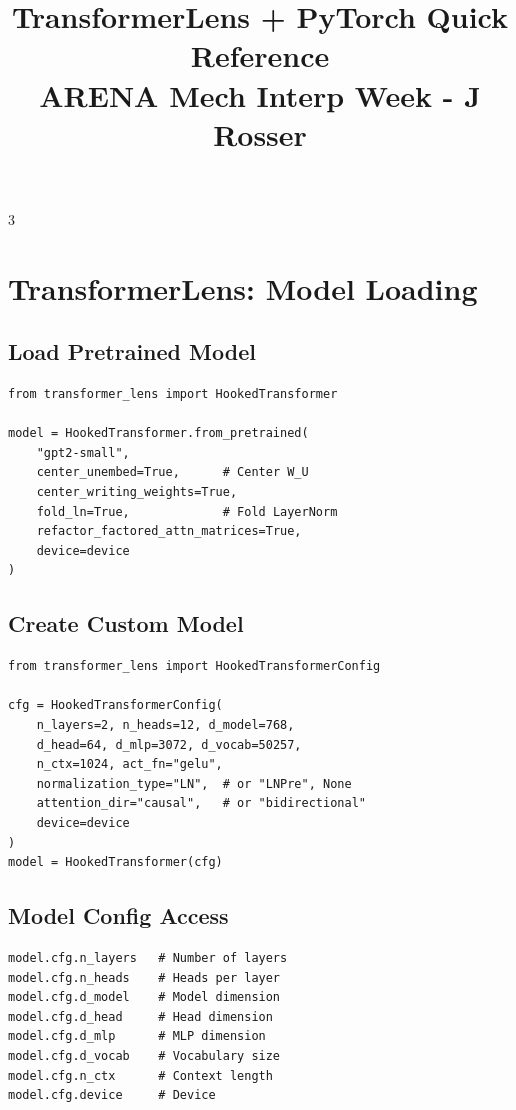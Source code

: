 \documentclass[10pt,a4paper,landscape]{article}
\title{\vspace{-2em}\textbf{TransformerLens + PyTorch Quick Reference}\\\large ARENA Mech Interp Week - J Rosser}
\author{}
\date{}
\begin{document}
\maketitle
\vspace{-3em}

\begin{multicols}{3}

\section{TransformerLens: Model Loading}

\subsection{Load Pretrained Model}
\begin{lstlisting}
from transformer_lens import HookedTransformer

model = HookedTransformer.from_pretrained(
    "gpt2-small",
    center_unembed=True,      # Center W_U
    center_writing_weights=True,
    fold_ln=True,             # Fold LayerNorm
    refactor_factored_attn_matrices=True,
    device=device
)
\end{lstlisting}

\subsection{Create Custom Model}
\begin{lstlisting}
from transformer_lens import HookedTransformerConfig

cfg = HookedTransformerConfig(
    n_layers=2, n_heads=12, d_model=768,
    d_head=64, d_mlp=3072, d_vocab=50257,
    n_ctx=1024, act_fn="gelu",
    normalization_type="LN",  # or "LNPre", None
    attention_dir="causal",   # or "bidirectional"
    device=device
)
model = HookedTransformer(cfg)
\end{lstlisting}

\subsection{Model Config Access}
\begin{lstlisting}
model.cfg.n_layers   # Number of layers
model.cfg.n_heads    # Heads per layer
model.cfg.d_model    # Model dimension
model.cfg.d_head     # Head dimension
model.cfg.d_mlp      # MLP dimension
model.cfg.d_vocab    # Vocabulary size
model.cfg.n_ctx      # Context length
model.cfg.device     # Device
\end{lstlisting}


\end{multicols}
\end{document}
